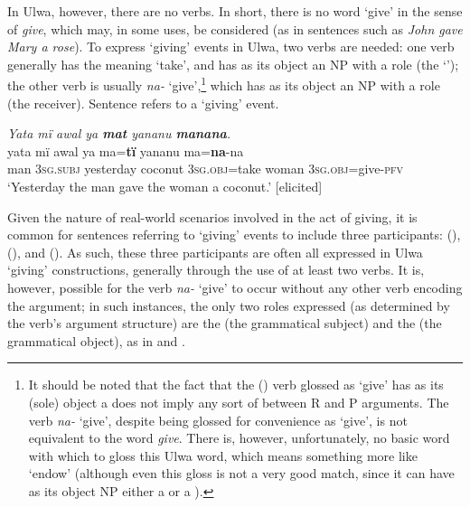   In Ulwa, however, there are no  verbs. In short, there is no word ‘give’ in the sense of  \textit{give}, which may, in some uses, be considered  (as in sentences such as \textit{John gave Mary a rose}). To express ‘giving’ events in Ulwa, two verbs are needed: one verb generally has the meaning ‘take’, and has as its object an NP with a  role (the ‘’); the other verb is usually \textit{na-} ‘give’,\footnote{It should be noted that the fact that the () verb glossed as ‘give’ has as its (sole) object a  does not imply any sort of  between R and P arguments. The verb \textit{na-} ‘give’, despite being glossed for convenience as ‘give’, is not equivalent to the  word \textit{give}. There is, however, unfortunately, no basic   word with which to gloss this  Ulwa word, which means something more like ‘endow’ (although even this  gloss is not a very good match, since it can have as its object NP either a  or a ).} which has as its object an NP with a  role (the receiver). Sentence  refers to a ‘giving’ event.

 \ea%
    \label{ex:clause:30b}
          \textit{Yata mï awal ya \textbf{mat} yananu \textbf{manana}.}\\
\gll    yata mï awal ya ma=\textbf{tï} yananu ma=\textbf{na}-na\\
   man \textsc{3sg.subj} yesterday coconut \textsc{3sg.obj}=take woman \textsc{3sg.obj}=give-\textsc{pfv}\\
\glt `Yesterday the man gave the woman a coconut.’ [elicited]
\z

  Given the nature of real-world scenarios involved in the act of giving, it is common for sentences referring to ‘giving’ events to include three participants:  (),  (), and  (). As such, these three participants are often all expressed in Ulwa ‘giving’ constructions, generally through the use of at least two verbs. It is, however, possible for the verb \textit{na-} ‘give’ to occur without any other verb encoding the  argument; in such instances, the only two roles expressed (as determined by the verb’s argument structure) are the  (the grammatical subject) and the  (the grammatical object), as in  and .

